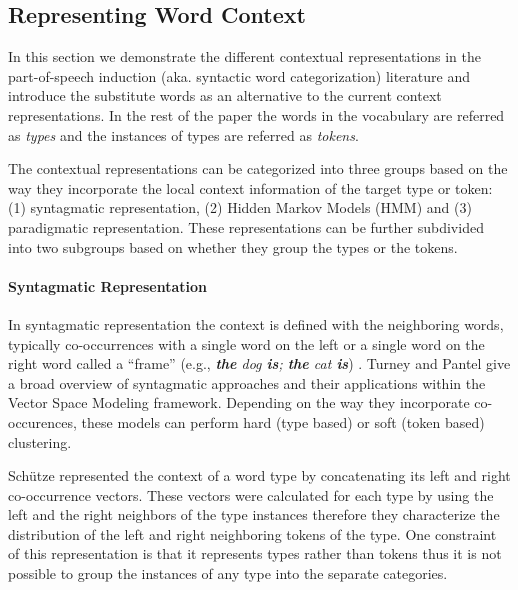\subsection{Representing Word Context}
\label{sec:representation}


In this section we demonstrate the different contextual
representations in the part-of-speech induction (aka. syntactic word
categorization) literature and introduce the substitute words as an
alternative to the current context representations.  In the rest of
the paper the words in the vocabulary are referred as {\em types} and
the instances of types are referred as {\em tokens}.

The contextual representations can be categorized into three groups
based on the way they incorporate the local context information of the
target type or token: (1) syntagmatic representation, (2) Hidden
Markov Models (HMM) and (3) paradigmatic representation.  These
representations can be further subdivided into two subgroups based on
whether they group the types or the tokens.

\paragraph{Syntagmatic Representation}

In syntagmatic representation the context is defined with the
neighboring words, typically co-occurrences with a single word on the
left or a single word on the right word called a ``frame'' (e.g., {\em
  {\bf the} dog {\bf is}; {\bf the} cat {\bf is}})
\cite{SchutzePe93,redington1998distributional,mintz2003frequent,20674613,lamar-EtAl:2010:Short,maron2010sphere}.
Turney and Pantel  give a
broad overview of syntagmatic approaches and their applications within
the Vector Space Modeling framework.  Depending on the way they
incorporate co-occurences, these models can perform hard (type based)
or soft (token based) clustering.

Sch\"{u}tze  represented the context of a word
type by concatenating its left and right co-occurrence vectors.  These
vectors were calculated for each type by using the left and the right
neighbors of the type instances therefore they characterize the
distribution of the left and right neighboring tokens of the type.
One constraint of this representation is that it represents types
rather than tokens thus it is not possible to group the instances of
any type into the separate categories.

